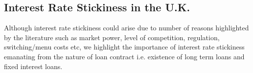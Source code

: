 \documentclass[12pt]{article}
\numberwithin{equation}{section}
\begin{document}
\subsection{Interest Rate Stickiness in the U.K.}



Although interest rate stickiness could arise due to number of reasons highlighted by the literature such as market power, level of competition, regulation, switching/menu costs etc, we highlight the importance of interest rate stickiness emanating from the nature of loan contract i.e. existence of long term loans and fixed interest loans.
\end{document}
